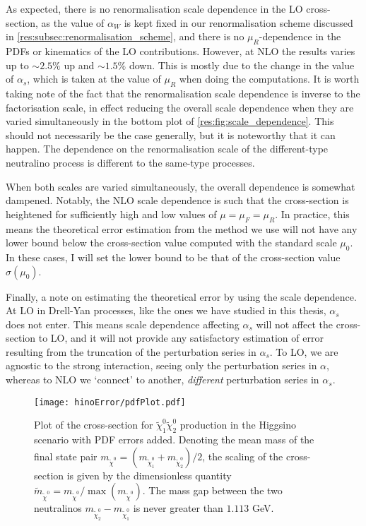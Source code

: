 \documentclass[../main.tex]{subfiles}
\begin{document}
As expected, there is no renormalisation scale dependence in the LO cross-section, as the value of \(\alpha_W\) is kept fixed in our renormalisation scheme discussed in \cref{res:subsec:renormalisation_scheme}, and there is no \(\mu_R\)-dependence in the PDFs or kinematics of the LO contributions.
However, at NLO the results varies up to \(\sim 2.5\%\) up and \(\sim 1.5\%\) down.
This is mostly due to the change in the value of \(\alpha_s\), which is taken at the value of \(\mu_R\) when doing the computations.
It is worth taking note of the fact that the renormalisation scale dependence is inverse to the factorisation scale, in effect reducing the overall scale dependence when they are varied simultaneously in the bottom plot of \cref{res:fig:scale_dependence}.
This should not necessarily be the case generally, but it is noteworthy that it can happen.
The dependence on the renormalisation scale of the different-type neutralino process is different to the same-type processes.

When both scales are varied simultaneously, the overall dependence is somewhat dampened.
Notably, the NLO scale dependence is such that the cross-section is heightened for sufficiently high and low values of \(\mu = \mu_F = \mu_R\).
In practice, this means the theoretical error estimation from the method we use will not have any lower bound below the cross-section value computed with the standard scale \(\mu_0\).
In these cases, I will set the lower bound to be that of the cross-section value \(\sigma(\mu_0)\).
\medskip

Finally, a note on estimating the theoretical error by using the scale dependence.
At LO in Drell-Yan processes, like the ones we have studied in this thesis, \(\alpha_s\) does not enter.
This means scale dependence affecting \(\alpha_s\) will not affect the cross-section to LO, and it will not provide any satisfactory estimation of error resulting from the truncation of the perturbation series in \(\alpha_s\).
To LO, we are agnostic to the strong interaction, seeing only the perturbation series in \(\alpha\), whereas to NLO we `connect' to another, \emph{different} perturbation series in \(\alpha_s\).


\begin{figure}[ht!]
  \centering
  \texttt{[image: hinoError/pdfPlot.pdf]}
  \caption{Plot of the cross-section for \(\tilde\chi^0_1 \tilde\chi^0_2\) production in the Higgsino scenario with PDF errors added.
    Denoting the mean mass of the final state pair \(m_{\tilde\chi^0} = (m_{\tilde\chi^0_1} + m_{\tilde\chi^0_2}) / 2\), the scaling of the cross-section is given by the dimensionless quantity \(\tilde{m}_{\tilde\chi^0} = m_{\tilde\chi^0} / \operatorname{max}(m_{\tilde\chi^0})\).
    The mass gap between the two neutralinos \(m_{\tilde\chi^0_2} - m_{\tilde\chi^0_1}\) is never greater than \(1.113\) GeV.}
  \label{res:fig:pdf_error}
\end{figure}
\end{document}
